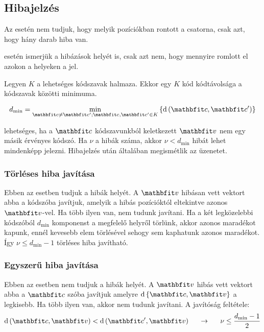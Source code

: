 \documentclass[../main.tex]{subfiles}
\begin{document}
\subsection{Hibajelzés}

Az  esetén nem tudjuk, hogy melyik pozíciókban rontott
a csatorna, csak azt, hogy hány darab hiba van.

 esetén ismerjük a hibázások helyét is, csak azt nem,
hogy mennyire romlott el azokon a helyeken a jel.

Legyen $K$ a lehetséges kódszavak halmaza. Ekkor egy $K$ kód kódtávolsága
a kódszavak közötti  minimuma.

\[
  d_\mathrm{{min}} = \min_{
    \rvec{c} \neq \rvec{c'};\rvec{c}, \rvec{c'} \in K
  } \left\{ \dist \left( \rvec{c}, \rvec{c'} \right) \right\}
\]

 lehetséges, ha a $\rvec{c}$ kódszavunkból
keletkezett $\rvec{v}$ nem egy másik érvényes kódszó. Ha $\nu$
a hibák száma, akkor $\nu < d_\mathrm{min}$ hibát lehet mindenképp
jelezni. Hibajelzés után általában megismétlik az üzenetet.

\subsubsection*{Törléses hiba javítása}

Ebben az esetben tudjuk a hibák helyét.
A $\rvec{v}$ hibásan vett vektort abba a kódszóba javítjuk,
amelyik a hibás pozícióktól eltekintve azonos $\rvec{v}$-vel.
Ha több ilyen van, nem tudunk javítani.
Ha a két legközelebbi kódszóból $d_\mathrm{min}$ komponenst
a megfelelő helyről törlünk, akkor azonos maradékot kapunk,
ennél kevesebb elem törlésével sehogy sem kaphatunk azonos
maradékot. Így $\nu \leq d_\mathrm{min} - 1$ törléses hiba javítható.

\subsubsection*{Egyszerű hiba javítása}

Ebben az esetben nem tudjuk a hibák helyét.
A $\rvec{v}$ hibás vett vektort abba a $\rvec{c}$
szóba javítjuk amelyre $\mathrm{d} \left\{
  \rvec{c}, \rvec{v}
  \right\}$ a legkisebb. Ha több ilyen van,
akkor nem tudunk javítani. A javítóság feltétele:
\begin{equation*}
  \mathrm{d} \left( \rvec{c}, \rvec{v} \right)
  < \mathrm{d} \left( \rvec{c'}, \rvec{v} \right)
  \hspace*{1.5em} \rightarrow \hspace*{1.5em}
  \nu \leq \frac{d_\mathrm{min} - 1}{2}
\end{equation*}
\end{document}
